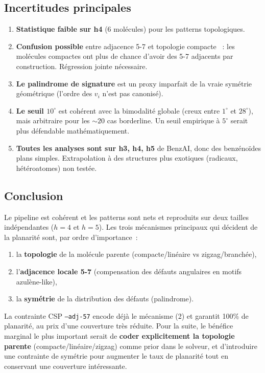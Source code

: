 \documentclass[11pt,a4paper]{article}
\begin{document}
\subsection{Incertitudes principales}

\begin{enumerate}[leftmargin=2em,itemsep=0.3em]
  \item \textbf{Statistique faible sur h4} (6 molécules) pour les patterns topologiques.
  \item \textbf{Confusion possible} entre \og adjacence 5-7 \fg{} et \og topologie compacte \fg{}~: les molécules compactes ont plus de chance d'avoir des 5-7 adjacents par construction. Régression jointe nécessaire.
  \item \textbf{Le \og palindrome de signature \fg{}} est un proxy imparfait de la vraie symétrie géométrique (l'ordre des $v_i$ n'est pas canonisé).
  \item \textbf{Le seuil $10^\circ$} est cohérent avec la bimodalité globale (creux entre $1^\circ$ et $28^\circ$), mais arbitraire pour les ${\sim}20$ cas borderline. Un seuil empirique à $5^\circ$ serait plus défendable mathématiquement.
  \item \textbf{Toutes les analyses sont sur h3, h4, h5} de BenzAI, donc des benzénoïdes plans simples. Extrapolation à des structures plus exotiques (radicaux, hétéroatomes) non testée.
\end{enumerate}

\subsection{Conclusion}

Le pipeline est cohérent et les patterns sont nets et reproduits sur deux tailles indépendantes ($h=4$ et $h=5$). Les trois mécanismes principaux qui décident de la planarité sont, par ordre d'importance~:
\begin{enumerate}[leftmargin=2em,itemsep=0.2em]
  \item la \textbf{topologie} de la molécule parente (compacte/linéaire vs zigzag/branchée),
  \item l'\textbf{adjacence locale 5-7} (compensation des défauts angulaires en motifs azulène-like),
  \item la \textbf{symétrie} de la distribution des défauts (palindrome).
\end{enumerate}
La contrainte CSP \texttt{--adj-57} encode déjà le mécanisme (2) et garantit 100\% de planarité, au prix d'une couverture très réduite. Pour la suite, le bénéfice marginal le plus important serait de \textbf{coder explicitement la topologie parente} (compacte/linéaire/zigzag) comme prior dans le solveur, et d'introduire une contrainte de symétrie pour augmenter le taux de planarité tout en conservant une couverture intéressante.
\end{document}
